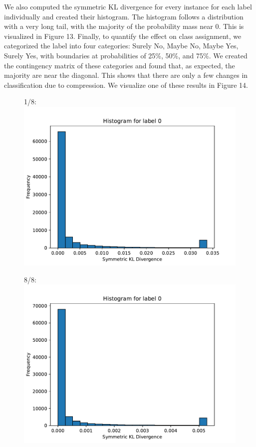 \documentclass[runningheads]{llncs}
\begin{document}
We also computed the symmetric KL divergence for every instance for each label individually and 
created their histogram. The histogram follows a distribution with a very long tail, with the majority 
of the probability mass near 0. This is visualized in Figure 13. 
Finally, to quantify the effect on class assignment, we categorized the label into four categories: Surely 
No, Maybe No, Maybe Yes, Surely Yes, with boundaries at probabilities of 25\%, 50\%, and 75\%. We 
created the contingency matrix of these categories and found that, as expected, the majority are near 
the diagonal. This shows that there are only a few changes in classification due to compression. We 
visualize one of these results in Figure 14. 

\begin{figure}
\begin{minipage}{0.45\linewidth}
1/8:\\
\includegraphics[width=1.2\textwidth,trim= 0 0 0 0.9cm,clip]{figures/8_1_histogram_0.pdf}
\end{minipage}
\hfill
\begin{minipage}{0.45\linewidth}
    8/8:\\
    \includegraphics[width=1.2\textwidth,trim= 0 0 0 0.9cm,clip]{figures/8_8_histogram_0.pdf}

\end{minipage}
\end{figure}
\end{document}
